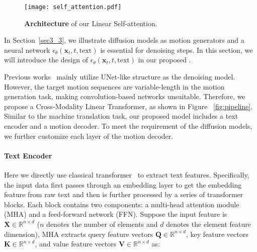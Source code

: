 \begin{figure}[t]
    \centering
    \texttt{[image: self\_attention.pdf]}
    \caption{\textbf{Architecture} of our Linear Self-attention.}
    \label{fig:arch}
\end{figure}

In Section~\ref{sec3_3}, we illustrate diffusion models as motion generators and a neural network $\epsilon_{\theta}(\mathbf{x}_t,t,\textrm{text})$ is essential for denoising steps. In this section, we will introduce the design of $\epsilon_{\theta}(\mathbf{x}_t,t,\textrm{text})$ in our proposed \name.

Previous works~\citep{ho2020denoising,dhariwal2021diffusion,nichol2021improved,nichol2021glide} mainly utilize UNet-like structure as the denoising model. However, the target motion sequences are variable-length in the motion generation task, making convolution-based networks unsuitable. Therefore, we propose a Cross-Modality Linear Transformer, as shown in Figure ~\ref{fig:pipeline}. Similar to the machine translation task, our proposed model includes a text encoder and a motion decoder. To meet the requirement of the diffusion models, we further customize each layer of the motion decoder.

\paragraph{Text Encoder} Here we directly use classical transformer~\cite{vaswani2017attention} to extract text features. Specifically, the input data first passes through an embedding layer to get the embedding feature from raw text and then is further processed by a series of transformer blocks. Each block contains two components: a multi-head attention module (MHA) and a feed-forward network (FFN). Suppose the input feature is $\mathbf{X} \in \mathbb{R}^{n \times d}$ ($n$ denotes the number of elements and $d$ denotes the element feature dimension), MHA extracts query feature vectors $\mathbf{Q} \in \mathbb{R}^{n \times d}$, key feature vectors $\mathbf{K} \in \mathbb{R}^{n \times d}$, and value feature vectors $\mathbf{V} \in \mathbb{R}^{n \times d}$ as:


